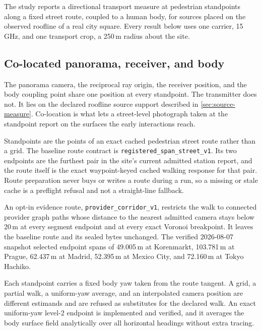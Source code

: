 
The study reports a directional transport measure at pedestrian standpoints
along a fixed street route, coupled to a human body, for sources placed on the
observed roofline of a real city square. Every result below uses one carrier,
15\,GHz, and one transport crop, a 250\,m radius about the site.

\subsection{Co-located panorama, receiver, and body}
\label{sec:colocation}

The panorama camera, the reciprocal ray origin, the receiver position, and the
body coupling point share one position at every standpoint. The transmitter
does not. It lies on the declared roofline source support described in
\cref{sec:source-measure}. Co-location is what lets a street-level photograph
taken at the standpoint report on the surfaces the early interactions reach.

Standpoints are the points of an exact cached pedestrian street route rather
than a grid. The baseline route contract is
\texttt{registered\_span\_street\_v1}. Its two endpoints are the furthest pair
in the site's current admitted station report, and the route itself is the
exact waypoint-keyed cached walking response for that pair. Route preparation
never buys or writes a route during a run, so a missing or stale cache is a
preflight refusal and not a straight-line fallback.

An opt-in evidence route, \texttt{provider\_corridor\_v1}, restricts the walk
to connected provider graph paths whose distance to the nearest admitted
camera stays below 20\,m at every segment endpoint and at every exact Voronoi
breakpoint. It leaves the baseline route and its sealed bytes unchanged. The
verified 2026-08-07 snapshot selected endpoint spans of 49.005\,m at
Korenmarkt, 103.781\,m at Prague, 62.437\,m at Madrid, 52.395\,m at Mexico
City, and 72.160\,m at Tokyo Hachiko.

Each standpoint carries a fixed body yaw taken from the route tangent. A grid,
a partial walk, a uniform-yaw average, and an interpolated camera position are
different estimands and are refused as substitutes for the declared walk. An
exact uniform-yaw level-2 endpoint is implemented and verified, and it averages
the body surface field analytically over all horizontal headings without extra
tracing. 

